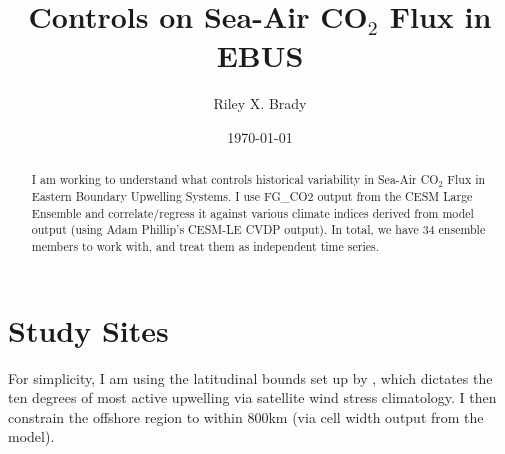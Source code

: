 \documentclass[12pt]{article}
\title{Controls on Sea-Air CO$_{2}$ Flux in EBUS}
\author{Riley X. Brady}
\date{\today}
\begin{document}
\maketitle
\begin{abstract}
\noindent I am working to understand what controls historical variability in Sea-Air CO$_{2}$ Flux in Eastern Boundary Upwelling Systems. I use FG\_CO2 output from the CESM Large Ensemble and correlate/regress it against various climate indices derived from model output (using Adam Phillip's CESM-LE CVDP output). In total, we have 34 ensemble members to work with, and treat them as independent time series.
\end{abstract}

\newpage
\section{Study Sites}
For simplicity, I am using the latitudinal bounds set up by \citet{Chavez:2009}, which dictates the ten degrees of most active upwelling via satellite wind stress climatology. I then constrain the offshore region to within 800km (via cell width output from the model). 
\end{document}
